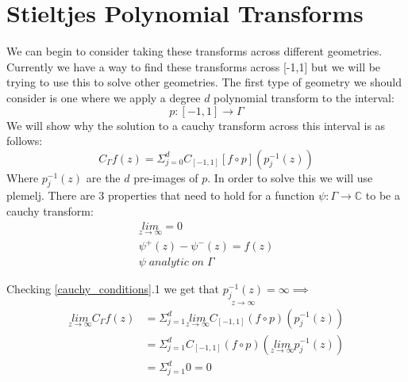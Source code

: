 \documentclass{article}
\begin{document}
\section{Stieltjes Polynomial Transforms}
We can begin to consider taking these transforms across different geometries.
Currently we have a way to find these transforms across [-1,1] but we will be trying to use this to solve other geometries.
The first type of geometry we should consider is one where we apply a degree $d$ polynomial transform to the interval:
$$p:[-1,1]\rightarrow \Gamma$$
We will show why the solution to a cauchy transform across this interval is as follows:
\begin{equation}
C_\Gamma f(z) = \Sigma_{j=0}^dC_{[-1,1]}[f\circ p](p_j^{-1}(z))
\end{equation}
Where $p_j^{-1}(z)$ are the $d$ pre-images of $p$.
In order to solve this we will use plemelj.
There are 3 properties that need to hold for a function $\psi: \Gamma \rightarrow \mathbb{C}$ to be a cauchy transform:
\begin{equation}\label{cauchy_conditions}\begin{gathered}
\underset{z\to\infty}{lim}= 0 \\
\psi^+(z)-\psi^-(z)= f(z) \\
\psi\;analytic\;on\;\Gamma 
\end{gathered}\end{equation}

Checking \eqref{cauchy_conditions}.1 we get that $\underset{z\to\infty}{p_j^{-1}(z)} = \infty \implies$
\begin{equation}\begin{split}
\underset{z\to\infty}{lim}C_\Gamma f(z) &= \Sigma_{j=1}^d \underset{z\to\infty}{lim}C_{[-1,1]}(f\circ p)(p_j^{-1}(z)) \\
&= \Sigma_{j=1}^d C_{[-1,1]}(f\circ p)(\underset{z\to\infty}{lim} p_j^{-1}(z)) \\
&= \Sigma_{j=1}^d 0 = 0
\end{split}\end{equation}
\end{document}
